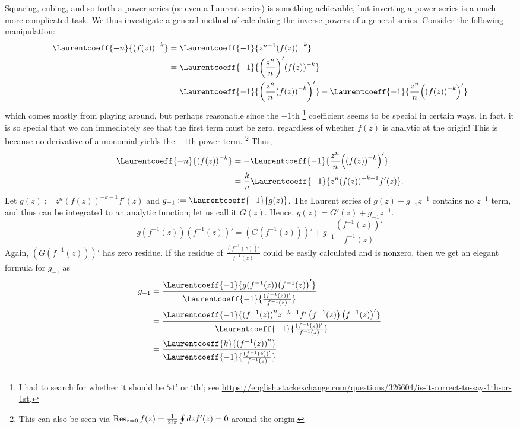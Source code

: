 Squaring, cubing, and so forth a power series (or even a Laurent series) is something achievable,
but inverting a power series is a much more complicated task.
We thus investigate a general method of calculating the inverse powers of a general series.
Consider the following manipulation:
\begin{align*}
    \Laurentcoeff{-n}{{(f(z))}^{-k}}
    &= \Laurentcoeff{-1}{z^{n - 1} {(f(z))}^{-k}} \\
    &= \Laurentcoeff{-1}{{\left( \frac{z^n}{n} \right)}' {(f(z))}^{-k}} \\
    &= \Laurentcoeff{-1}{{\left( \frac{z^n}{n} {(f(z))}^{-k} \right)}'}
     - \Laurentcoeff{-1}{\frac{z^n}{n} {\left( {(f(z))}^{-k} \right)}'}
\end{align*}
which comes mostly from playing around, but perhaps reasonable since the $-1$th%
\footnote{I had to search for whether it should be `st' or `th'; see \url{https://english.stackexchange.com/questions/326604/is-it-correct-to-say-1th-or-1st}.}
coefficient seems to be special in certain ways.
In fact, it is so special that we can immediately see that the first term must be zero,
regardless of whether $f(z)$ is analytic at the origin!
This is because no derivative of a monomial yields the $-1$th power term.%
\footnote{This can also be seen via $\mathop{\mathrm{Res}}_{z=0}{f(z)} = \frac{1}{2i\pi} \oint dz f'(z) = 0$ around the origin.}
Thus,
\begin{align*}
    \Laurentcoeff{-n}{{(f(z))}^{-k}}
    &= -\Laurentcoeff{-1}{\frac{z^n}{n} {\left( {(f(z))}^{-k} \right)}'} \\
    &= \frac{k}{n} \Laurentcoeff{-1}{z^n {(f(z))}^{-k-1} f'(z)}.
\end{align*}
Let $g(z) := z^n {(f(z))}^{-k-1} f'(z)$ and $g_{-1} := \Laurentcoeff{-1}{g(z)}$.
The Laurent series of $g(z) - g_{-1} z^{-1}$ contains no $z^{-1}$ term,
and thus can be integrated to an analytic function; let us call it $G(z)$.
Hence, $g(z) = G'(z) + g_{-1} z^{-1}$.
\[
    g(f^{-1}(z)) {\left( f^{-1} (z) \right)}'
    = {\left( G(f^{-1} (z)) \right)}'+ g_{-1} \frac{{\left( f^{-1} (z) \right)}'}{f^{-1} (z)}
\]
Again, ${\left( G(f^{-1} (z)) \right)}'$ has zero residue.
If the residue of $\frac{{\left( f^{-1} (z) \right)}'}{f^{-1} (z)}$ could be easily calculated and is nonzero,
then we get an elegant formula for $g_{-1}$ as
\begin{align*}
    g_{-1}
    &= \frac{
        \Laurentcoeff{-1}{g(f^{-1}(z)) {\left( f^{-1} (z) \right)}'}
    }{
        \Laurentcoeff{-1}{\frac{{\left( f^{-1} (z) \right)}'}{f^{-1} (z)}}
    } \\
    &= \frac{
        \Laurentcoeff{-1}{{(f^{-1} (z))}^n z^{-k-1} f'\left( f^{-1} (z) \right) {\left( f^{-1} (z) \right)}'}
    }{
        \Laurentcoeff{-1}{\frac{{\left( f^{-1} (z) \right)}'}{f^{-1} (z)}}
    } \\
    &= \frac{\Laurentcoeff{k}{{(f^{-1} (z))}^n}}{
        \Laurentcoeff{-1}{\frac{{\left( f^{-1} (z) \right)}'}{f^{-1} (z)}}
    }
\end{align*}
